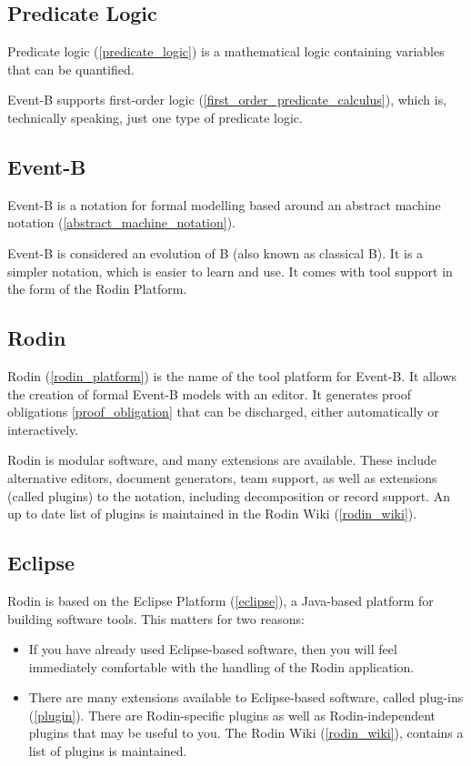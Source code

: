 \subsection{Predicate Logic}

Predicate logic (\ref{predicate_logic}) is a mathematical logic containing variables that can be quantified.

Event-B supports first-order logic (\ref{first_order_predicate_calculus}), which is, technically speaking, just one type of predicate logic.  

\subsection{Event-B}

Event-B is a notation for formal modelling based around an abstract machine notation (\ref{abstract_machine_notation}).

Event-B is considered an evolution of B (also known as classical B). It is a simpler notation, which is easier to learn and use. It comes with tool support in the form of the Rodin Platform.

\subsection{Rodin}

Rodin (\ref{rodin_platform}) is the name of the tool platform for Event-B.  It allows the creation of formal Event-B models with an editor.  It generates proof obligations \ref{proof_obligation} that can be discharged, either automatically or interactively.

Rodin is modular software, and many extensions are available.  These include alternative editors, document generators, team support, as well as extensions (called plugins) to the notation, including decomposition or record support.  An up to date list of plugins is maintained in the Rodin Wiki (\ref{rodin_wiki}).

\subsection{Eclipse} \label{subsection_eclipse}

Rodin is based on the Eclipse Platform (\ref{eclipse}), a Java-based platform for building software tools.  This matters for two reasons:
\begin{itemize}
	\item If you have already used Eclipse-based software, then you will feel immediately comfortable with the handling of the Rodin application.
	\item There are many extensions available to Eclipse-based software, called plug-ins (\ref{plugin}).  There are Rodin-specific plugins as well as Rodin-independent plugins that may be useful to you.  The Rodin Wiki (\ref{rodin_wiki}), contains a list of plugins is maintained.
\end{itemize}


